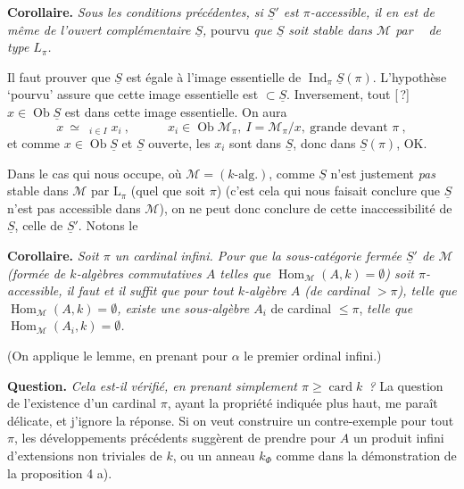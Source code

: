 \documentclass[11pt]{article}
\newcommand{\printedpage}[1]{\marginpar{\footnotesize p.~#1}}
\newcommand{\msp}[1]{\marginpar{\footnotesize [#1]}}
\newcommand{\Hom}{\operatorname{Hom}}
\newcommand{\card}{\operatorname{card}}
\newcommand{\limind}{\mathop{\underrightarrow{\mathrm{lim}}}}
\begin{document}
\textbf{Corollaire.} \textit{Sous les conditions précédentes, si $\underline{S}'$ est $\pi$-accessible, il en est de même de l'ouvert complémentaire $\underline{S}$,} pourvu \textit{que $\underline{S}$ soit stable dans $\mathcal{M}$ par $\limind$ de type $L_\pi$.}

Il faut prouver que $\underline{S}$ est égale à l'image essentielle de $\operatorname{Ind}_\pi\underline{S}(\pi)$. L'hypothèse `pourvu' assure que cette image essentielle est $\subset\underline{S}$. Inversement, tout [\,?] $x\in\operatorname{Ob}\underline{S}$ est dans cette image essentielle. On aura
\[
x\ \simeq\ \limind_{i\in I}x_i\ ,\qquad\quad x_i\in\operatorname{Ob}\mathcal{M}_\pi,\ I=\mathcal{M}_\pi/x,\ \text{grande devant } \pi\ ,
\]
et comme $x\in\operatorname{Ob}\underline{S}$ et $\underline{S}$ ouverte, les $x_i$ sont dans $\underline{S}$, donc dans $\underline{S}(\pi)$, OK.

Dans le cas qui nous occupe, où $\mathcal{M}=(k\text{-alg.})$, comme $\underline{S}$ n'est justement \textit{pas} stable dans $\mathcal{M}$ par $\mathrm{L}_\pi$ (quel que soit $\pi$) (c'est cela qui nous faisait conclure que
\msp{page 19}
$\underline{S}$ n'est pas accessible dans $\mathcal{M}$), on ne peut donc conclure de cette inaccessibilité de $\underline{S}$, celle de $\underline{S}'$. Notons le

\printedpage{199}

\noindent\textbf{Corollaire.} \textit{Soit $\pi$ un cardinal infini. Pour que la sous-catégorie fermée $\underline{S}'$ de $\mathcal{M}$ (formée de $k$-algèbres commutatives $A$ telles que $\Hom_{\mathcal{M}}(A,k)=\emptyset$) soit $\pi$-accessible, il faut et il suffit que pour tout $k$-algèbre $A$ (de cardinal ${}>\pi$), telle que $\Hom_{\mathcal{M}}(A,k)=\emptyset$, existe une sous-algèbre $A_i$} de cardinal $\leqslant\pi$, \textit{telle que $\Hom_{\mathcal{M}}(A_i,k)=\emptyset$.} %

\noindent(On applique le lemme, en prenant pour $\alpha$ le premier ordinal infini.)

\noindent\textbf{Question.} \textit{Cela est-il vérifié, en prenant simplement $\pi\geqslant\card k$~?} La question de l'existence d'un cardinal $\pi$, ayant la propriété indiquée plus haut, me paraît délicate, et j'ignore la réponse. Si on veut construire un contre-exemple pour tout $\pi$, les développements précédents suggèrent de prendre pour $A$ un produit infini d'extensions non triviales de $k$, ou un anneau $k_{\Phi}$ comme dans la démonstration de la proposition 4 a).
\end{document}
